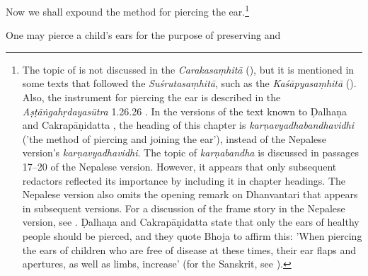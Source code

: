\begin{translation}
    \item [1] Now we shall expound the method for piercing the ear.\footnote{The 
    topic of   is not discussed in the 
    \emph{Carakasaṃhitā} (\cite[IB, 326, n.\,175]{meul-hist}), but it is mentioned 
    in some texts that followed the \emph{Suśrutasaṃhitā}, such as the 
    \emph{Kaśāpyasaṃhitā} (\cite[IIA, 30]{meul-hist}). Also, the instrument for 
    piercing the ear is described in the \emph{Aṣṭāṅgahṛdayasūtra} 1.26.26 
    \citep[153]{kunt-1902}. In the versions of the text known to Ḍalhaṇa 
    \citep[76]{vulgate} and Cakrapāṇidatta \citep[125]{acar-1939}, the heading of 
    this chapter is \emph{karṇavyadhabandhavidhi} ('the method of piercing and 
    joining the ear'), instead of the Nepalese version's \emph{karṇavyadhavidhi}. 
    The topic of \emph{karṇabandha} is discussed in passages 17--20 of the 
    Nepalese version. However, it appears that only subsequent redactors reflected 
    its importance by including it in chapter headings. The Nepalese version also 
    omits the opening remark on Dhanvantari that appears in subsequent versions. 
    For a discussion of the frame story in the Nepalese version, see 
    \cite{birc-2021}. Ḍalhaṇa \citep[76]{vulgate} and Cakrapāṇidatta 
    \citep[125]{acar-1939} state that only the ears of healthy people should be 
    pierced, and they quote Bhoja to affirm this: 'When piercing the ears of children 
    who are free of disease at these times, their ear flaps and apertures, as well as 
    limbs, increase' (for the Sanskrit, see \cite[76]{vulgate}).}
    \item [2] One may pierce a child's ears for the purpose of preserving and 

\end{translation}
